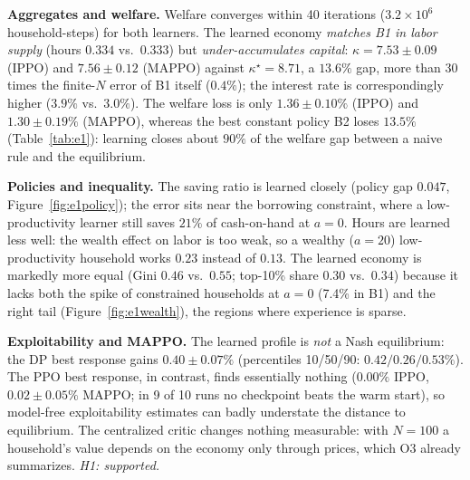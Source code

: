 \documentclass{article}
\begin{document}
\textbf{Aggregates and welfare.} Welfare converges within 40 iterations ($3.2\times10^6$ household-steps) for both learners. The learned economy \emph{matches B1 in labor supply} (hours $0.334$ vs.\ $0.333$) but \emph{under-accumulates capital}: $\kappa=7.53\pm0.09$ (IPPO) and $7.56\pm0.12$ (MAPPO) against $\kappa^\star=8.71$, a $13.6\%$ gap, more than 30 times the finite-$N$ error of B1 itself ($0.4\%$); the interest rate is correspondingly higher ($3.9\%$ vs.\ $3.0\%$). The welfare loss is only $1.36\pm0.10\%$ (IPPO) and $1.30\pm0.19\%$ (MAPPO), whereas the best constant policy B2 loses $13.5\%$ (Table~\ref{tab:e1}): learning closes about $90\%$ of the welfare gap between a naive rule and the equilibrium.

\textbf{Policies and inequality.} The saving ratio is learned closely (policy gap $0.047$, Figure~\ref{fig:e1policy}); the error sits near the borrowing constraint, where a low-productivity learner still saves $21\%$ of cash-on-hand at $a=0$. Hours are learned less well: the wealth effect on labor is too weak, so a wealthy ($a=20$) low-productivity household works $0.23$ instead of $0.13$. The learned economy is markedly more equal (Gini $0.46$ vs.\ $0.55$; top-10\% share $0.30$ vs.\ $0.34$) because it lacks both the spike of constrained households at $a=0$ (7.4\% in B1) and the right tail (Figure~\ref{fig:e1wealth}), the regions where experience is sparse.

\textbf{Exploitability and MAPPO.} The learned profile is \emph{not} a Nash equilibrium: the DP best response gains $0.40\pm0.07\%$ (percentiles 10/50/90: $0.42/0.26/0.53\%$). The PPO best response, in contrast, finds essentially nothing ($0.00\%$ IPPO, $0.02\pm0.05\%$ MAPPO; in 9 of 10 runs no checkpoint beats the warm start), so model-free exploitability estimates can badly understate the distance to equilibrium. The centralized critic changes nothing measurable: with $N=100$ a household's value depends on the economy only through prices, which O3 already summarizes. \emph{H1: supported.}
\end{document}
